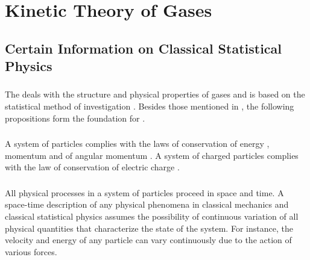 
\chapter{Kinetic Theory of Gases}
\label{ch-10}


\section{Certain Information on Classical Statistical Physics}
\label{sec-10.1}

\subsection{}\label{10.1.1}The  deals with the structure and physical properties of gases and is based on the statistical method of investigation . Besides those mentioned in , the following propositions form the foundation for .

\subsection{}\label{10.1.2} A system of particles complies with the laws of conser­vation of energy , momentum  and of angular momentum . A system of charged particles complies with the law of conservation of electric charge . 

\subsection{}\label{10.1.3} All physical processes in a system of particles proceed  in space and time. A space-time description of any physical phenomena in classical mechanics and classical sta­tistical physics assumes the possibility of continuous variation of all physical quantities that characterize the state of the system. For instance, the velocity and energy of any particle can vary continuously due to the action of various forces. 

